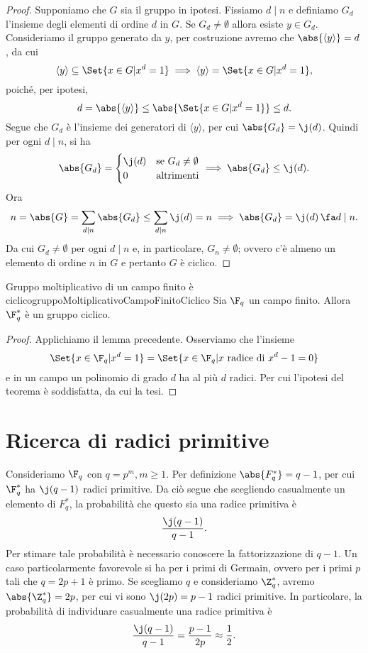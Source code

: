 	\begin{proof}
	Supponiamo che \(G\) sia il gruppo in ipotesi. Fissiamo \(d\mid n\) e definiamo \(G_d\) l'insieme degli elementi di ordine \(d\) in \(G\).
	Se \(G_d\neq \emptyset\) allora esiste \(y\in G_d\). Consideriamo il gruppo generato da \(y\), per costruzione avremo che \(\abs{\langle y \rangle}=d\), da cui
		\[
		\langle y \rangle \subseteq \Set{x\in G | x^d = 1} \implies \langle y \rangle = \Set{x\in G | x^d =1},
		\]
	poiché, per ipotesi,
		\[
		d = \abs{\langle y \rangle} \le \abs{\Set{x\in G | x^d = 1}} \le d.
		\]
	Segue che \(G_d\) è l'insieme dei generatori di \(\langle y \rangle\), per cui \(\abs{G_d}=\j(d)\).
	Quindi per ogni \(d\mid n\), si ha
		\[
		\abs{G_d} = \begin{cases}
					\j(d) & \text{se }G_d\neq \emptyset\\
					0 & \text{altrimenti}
					\end{cases}
		\implies \abs{G_d} \le \j(d).
		\]
	Ora
		\[
		n = \abs{G} = \sum_{d\mid n} \abs{G_d} \le \sum_{d\mid n} \j(d) = n \implies \abs{G_d} = \j(d)\,\fa d \mid n.
		\]
	Da cui \(G_d\neq \emptyset\) per ogni \(d\mid n\) e, in particolare, \(G_n\neq \emptyset\); ovvero c'è almeno un elemento di ordine \(n\) in \(G\) e pertanto \(G\) è ciclico.
	\end{proof}

	\begin{teor}{Gruppo moltiplicativo di un campo finito è ciclico}{gruppoMoltiplicativoCampoFinitoCiclico}
	Sia \(\F_q\) un campo finito. Allora \(\F_q^*\) è un gruppo ciclico.
	\end{teor}

	\begin{proof}
	Applichiamo il lemma precedente. Osserviamo che l'insieme
		\[
		\Set{x \in \F_q | x^d = 1} = \Set{x\in \F_q | x \text{ radice di }x^d -1 = 0}
		\]
	e in un campo un polinomio di grado \(d\) ha al più \(d\) radici. Per cui l'ipotesi del teorema è soddisfatta, da cui la tesi.
	\end{proof}

\section{Ricerca di radici primitive}

	Consideriamo \(\F_q\) con \(q=p^m, m\ge 1\). Per definizione \(\abs{F_q^*}=q-1\), per cui \(\F_q^*\) ha \(\j(q-1)\) radici primitive.
	Da ciò segue che scegliendo casualmente un elemento di \(F_q^*\), la probabilità che questo sia una radice primitiva è
		\[
		\frac{\j(q-1)}{q-1}.
		\]
	Per stimare tale probabilità è necessario conoscere la fattorizzazione di \(q-1\).
	Un caso particolarmente favorevole si ha per i primi di Germain, ovvero per i primi \(p\) tali che \(q=2p+1\) è primo. Se scegliamo \(q\) e consideriamo \(\Z_q^*\), avremo \(\abs{\Z_q^*}=2p\), per cui vi sono \(\j(2p)=p-1\) radici primitive. In particolare, la probabilità di individuare casualmente una radice primitiva è
		\[
		\frac{\j(q-1)}{q-1} = \frac{p-1}{2p} \approx \frac{1}{2}.
		\]

